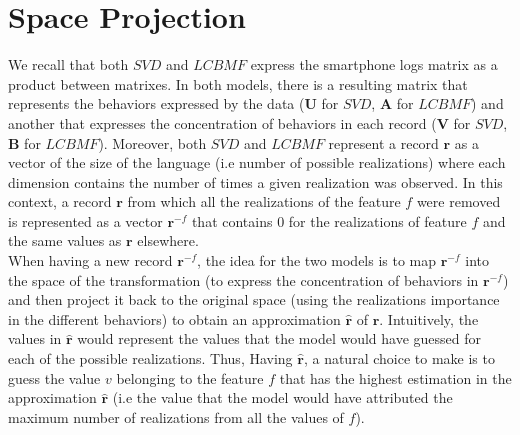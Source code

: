 
\section{Space Projection}

We recall that both $SVD$ and $LCBMF$ express the smartphone logs matrix as a product between matrixes. In both models, there is a resulting matrix that represents the behaviors expressed by the data ($\boldsymbol{U}$ for $SVD$, $\boldsymbol{A}$ for $LCBMF$) and another that expresses the concentration of behaviors in each record ($\boldsymbol{V}$ for $SVD$, $\boldsymbol{B}$ for $LCBMF$). Moreover, both $SVD$ and $LCBMF$ represent a record $\mathbf{r}$ as a vector of the size of the language (i.e number of possible realizations) where each dimension contains the number of times a given realization was observed. In this context, a record $\mathbf{r}$ from which all the realizations of the feature $f$ were removed is represented as a vector $\mathbf{r}^{-f}$ that contains $0$ for the realizations of feature $f$ and the same values as $\mathbf{r}$ elsewhere.
\\When having a new record $\mathbf{r}^{-f}$, the idea for the two models is to map $\mathbf{r}^{-f}$ into the space of the transformation (to express the concentration of behaviors in  $\mathbf{r}^{-f}$) and then project it back to the original space (using the realizations importance in the different behaviors) to obtain an approximation $\mathbf{\widehat{r}}$ of $\mathbf{r}$. Intuitively, the values in $\mathbf{\widehat{r}}$ would represent the values that the model would have guessed for each of the possible realizations. Thus, Having $\mathbf{\widehat{r}}$, a natural choice to make is to guess the value $v$ belonging to the feature $f$ that has the highest estimation in the approximation $\mathbf{\widehat{r}}$ (i.e the value that the model would have attributed the maximum number of realizations from all the values of $f$). \par

